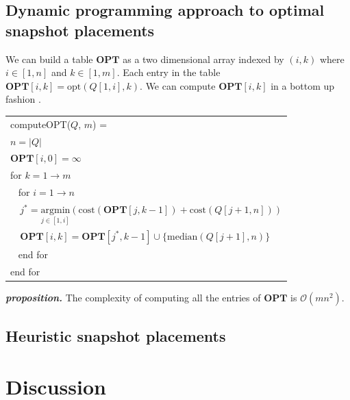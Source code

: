 \subsection{Dynamic programming approach to optimal snapshot placements}

We can build a table $\mathbf{OPT}$ as a two dimensional array
indexed by $(i, k)$ where $i\in [1, n]$ and $k\in [1, m]$.  Each entry
in the table $\mathbf{OPT}[i,k] = \mathrm{opt}(Q[1,i], k)$.
We can compute $\mathbf{OPT}[i,k]$ in a bottom up fashion \cite{}.

\vspace{1em}
{\small
	\begin{tabular}{|l|} \hline
		computeOPT($Q$, $m$) = \\
		\verb|| $n = |Q|$ \\
		\verb|| $\mathbf{OPT}[i, 0] = \infty$ \\
		\verb|| for $k = 1 \to m$ \\
		\verb| | for $i = 1 \to n$ \\
		\verb|  | $j^* = \underset{j\in[1,i]}{\mathrm{argmin}}
		(\mathrm{cost}(\mathbf{OPT}[j,k-1]) + \mathrm{cost}(Q[j+1, n]))$ \\
		\verb|  | $\mathbf{OPT}[i,k] = \mathbf{OPT}[j^*, k-1] \cup \{\mathrm{median}(Q[j+1], n)\}$ \\
		\verb| | end for \\
		\verb|| end for \\ \hline
	\end{tabular}
}
\vspace{1em}

\textbf{\emph{proposition.}} The complexity of computing all the entries of $\mathbf{OPT}$ is $\mathcal{O}(mn^2)$.

\subsection{Heuristic snapshot placements}

\section{Discussion}
